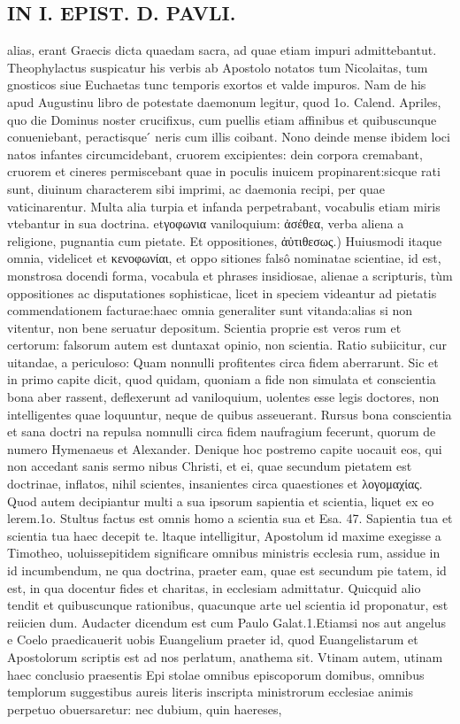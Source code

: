 \documentclass{article}
\begin{document}
\begin{pages}
\section*{IN I. EPIST. D. PAVLI. }
\marginpar{[ p.135 ]}\pstart alias, erant Graecis dicta quaedam sacra, ad quae etiam impuri admittebantut. Theophylactus suspicatur his verbis ab Apostolo notatos tum Nicolaitas, tum gnosticos siue Euchaetas tunc temporis exortos et valde impuros. Nam de his apud Augustinu libro de potestate daemonum legitur, quod 1o. Calend. Apriles, quo die Dominus noster crucifixus, cum puellis etiam affinibus et quibuscunque conueniebant, peractisque ́ neris cum illis coibant. Nono deinde mense ibidem loci natos infantes circumcidebant, cruorem excipientes: dein corpora cremabant, cruorem et cineres permiscebant quae in poculis inuicem propinarent:sicque rati sunt, diuinum characterem sibi imprimi, ac daemonia recipi, per quae vaticinarentur. Multa alia turpia et infanda perpetrabant, vocabulis etiam miris vtebantur in sua doctrina. etγοφωνια vaniloquium: ἀσέθεα, verba aliena a religione, pugnantia cum pietate.  \pend\pstart Et oppositiones, ἀὐτιθεσως.) Huiusmodi itaque omnia, videlicet et κενοφωνίαι, et oppo sitiones falsô nominatae scientiae, id est, monstrosa docendi forma, vocabula et phrases insidiosae, alienae a scripturis, tùm oppositiones ac disputationes sophisticae, licet in speciem videantur ad pietatis commendationem facturae:haec omnia generaliter sunt vitanda:alias si non vitentur, non bene seruatur depositum. Scientia proprie est veros rum et certorum: falsorum autem est duntaxat opinio, non scientia. Ratio subiicitur, cur uitandae, a periculoso: Quam nonnulli profitentes circa fidem aberrarunt. Sic et in primo capite dicit, quod quidam, quoniam a fide non simulata et conscientia bona aber rassent, deflexerunt ad vaniloquium, uolentes esse legis doctores, non intelligentes quae loquuntur, neque de quibus asseuerant. Rursus bona conscientia et sana doctri na repulsa nomnulli circa fidem naufragium fecerunt, quorum de numero Hymenaeus et Alexander. Denique hoc postremo capite uocauit eos, qui non accedant sanis sermo nibus Christi, et ei, quae secundum pietatem est doctrinae, inflatos, nihil scientes, insanientes circa quaestiones et λογομαχίας. Quod autem decipiantur multi a sua ipsorum sapientia et scientia, liquet ex eo lerem.1o. Stultus factus est omnis homo a scientia sua et Esa. 47. Sapientia tua et scientia tua haec decepit te. ltaque intelligitur, Apostolum id maxime exegisse a Timotheo, uoluissepitidem significare omnibus ministris ecclesia rum, assidue in id incumbendum, ne qua doctrina, praeter eam, quae est secundum pie tatem, id est, in qua docentur fides et charitas, in ecclesiam admittatur. Quicquid alio tendit et quibuscunque rationibus, quacunque arte uel scientia id proponatur, est reiicien dum. Audacter dicendum est cum Paulo Galat.1.Etiamsi nos aut angelus e Coelo praedicauerit uobis Euangelium praeter id, quod Euangelistarum et Apostolorum scriptis est ad nos perlatum, anathema sit. Vtinam autem, utinam haec conclusio praesentis Epi stolae omnibus episcoporum domibus, omnibus templorum suggestibus aureis literis inscripta ministrorum ecclesiae animis perpetuo obuersaretur: nec dubium, quin haereses, 
\end{pages}
\end{document}
